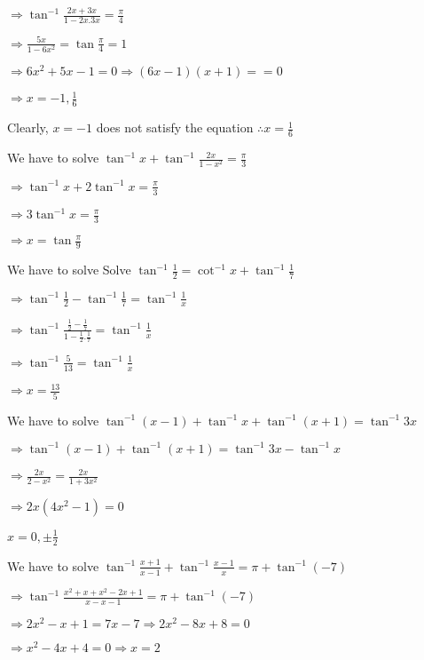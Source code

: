   $\Rightarrow \tan^{-1}\frac{2x + 3x}{1 - 2x.3x} = \frac{\pi}{4}$

  $\Rightarrow \frac{5x}{1 - 6x^2} = \tan\frac{\pi}{4} =1$

  $\Rightarrow 6x^2 + 5x - 1 = 0 \Rightarrow (6x - 1)(x + 1) = = 0$

  $\Rightarrow x = -1, \frac{1}{6}$

  Clearly, $x = -1$ does not satisfy the equation $\therefore x = \frac{1}{6}$

\item We have to solve $\tan^{-1} x + \tan^{-1}\frac{2x}{1 - x^2} = \frac{\pi}{3}$

  $\Rightarrow \tan^{-1}x + 2\tan^{-1}x = \frac{\pi}{3}$

  $\Rightarrow 3\tan^{-1}x = \frac{\pi}{3}$

  $\Rightarrow x = \tan\frac{\pi}{9}$

\item We have to solve Solve $\tan^{-1}\frac{1}{2} = \cot^{-1}x + \tan^{-1}\frac{1}{7}$

  $\Rightarrow \tan^{-1}\frac{1}{2} - \tan^{-1}\frac{1}{7} = \tan^{-1}\frac{1}{x}$

  $\Rightarrow \tan^{-1}\frac{\frac{1}{2} - \frac{1}{7}}{1 - \frac{1}{2}.\frac{1}{7}} = \tan^{-1}\frac{1}{x}$

  $\Rightarrow \tan^{-1}\frac{5}{13} = \tan^{-1}\frac{1}{x}$

  $\Rightarrow x = \frac{13}{5}$

\item We have to solve $\tan^{-1}(x - 1) + \tan^{-1}x + \tan^{-1}(x + 1) = \tan^{-1}3x$

  $\Rightarrow \tan^{-1}(x - 1) + \tan^{-1}(x + 1) = \tan^{-1}3x - \tan^{-1}x$

  $\Rightarrow \frac{2x}{2 - x^2} = \frac{2x}{1 + 3x^2}$

  $\Rightarrow 2x(4x^2 - 1) = 0$

  $x = 0, \pm\frac{1}{2}$

\item We have to solve $\tan^{-1}\frac{x + 1}{x - 1} + \tan^{-1}\frac{x - 1}{x} = \pi + \tan^{-1}(-7)$

  $\Rightarrow \tan^{-1}\frac{x^2 + x + x^2 -2x + 1}{x - x - 1} = \pi + \tan^{-1}(-7)$

  $\Rightarrow 2x^2 - x + 1 = 7x - 7 \Rightarrow 2x^2 - 8x + 8 = 0$

  $\Rightarrow x^2 - 4x + 4 = 0 \Rightarrow x = 2$

